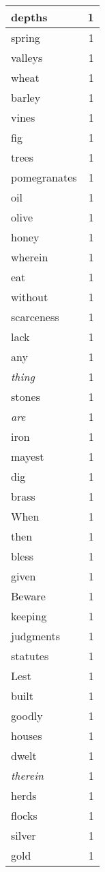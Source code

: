 \begin{center}
\begin{longtable}{l|r}
depths & 1 \\ \hline
spring & 1 \\ \hline
valleys & 1 \\ \hline
wheat & 1 \\ \hline
barley & 1 \\ \hline
vines & 1 \\ \hline
fig & 1 \\ \hline
trees & 1 \\ \hline
pomegranates & 1 \\ \hline
oil & 1 \\ \hline
olive & 1 \\ \hline
honey & 1 \\ \hline
wherein & 1 \\ \hline
eat & 1 \\ \hline
without & 1 \\ \hline
scarceness & 1 \\ \hline
lack & 1 \\ \hline
any & 1 \\ \hline
\emph{thing} & 1 \\ \hline
stones & 1 \\ \hline
\emph{are} & 1 \\ \hline
iron & 1 \\ \hline
mayest & 1 \\ \hline
dig & 1 \\ \hline
brass & 1 \\ \hline
When & 1 \\ \hline
then & 1 \\ \hline
bless & 1 \\ \hline
given & 1 \\ \hline
Beware & 1 \\ \hline
keeping & 1 \\ \hline
judgments & 1 \\ \hline
statutes & 1 \\ \hline
Lest & 1 \\ \hline
built & 1 \\ \hline
goodly & 1 \\ \hline
houses & 1 \\ \hline
dwelt & 1 \\ \hline
\emph{therein} & 1 \\ \hline
herds & 1 \\ \hline
flocks & 1 \\ \hline
silver & 1 \\ \hline
gold & 1 \\ \hline

\end{longtable}
\end{center}
